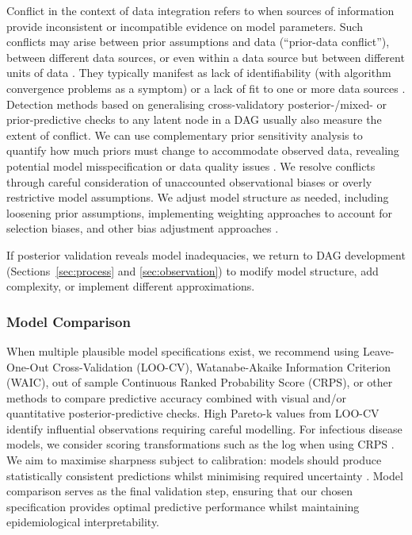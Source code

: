 \documentclass{article}
\begin{document}
Conflict in the context of data integration refers to when sources of information provide inconsistent or incompatible evidence on model parameters. Such conflicts may arise between prior assumptions and data (``prior-data conflict''), between different data sources, or even within a data source but between different units of data \citep{presanis2013conflict,yang2025detecting}.
They typically manifest as lack of identifiability (with algorithm convergence problems as a symptom) or a lack of fit to one or more data sources \citep{presanis2013conflict,deangelis2018analysing}. Detection methods based on generalising cross-validatory posterior-/mixed- or prior-predictive checks to any latent node in a DAG \citep{presanis2013conflict,yang2025detecting} usually also measure the extent of conflict. We can use complementary prior sensitivity analysis to quantify how much priors must change to accommodate observed data, revealing potential model misspecification or data quality issues \citep{Roos2015,Kallioinen2024,yang2025detecting}. We resolve conflicts through careful consideration of unaccounted observational biases or overly restrictive model assumptions. We adjust model structure as needed, including loosening prior assumptions, implementing weighting approaches to account for selection biases, and other bias adjustment approaches \citep{deangelis2018analysing}.

If posterior validation reveals model inadequacies, we return to DAG development (Sections~\ref{sec:process} and \ref{sec:observation}) to modify model structure, add complexity, or implement different approximations.

\subsubsection{Model Comparison}

When multiple plausible model specifications exist, we recommend using Leave-One-Out Cross-Validation (LOO-CV), Watanabe-Akaike Information Criterion (WAIC), out of sample Continuous Ranked Probability Score (CRPS), or other methods to compare predictive accuracy \citep{vehtari2017practical,yao2018using,gneiting2007strictly} combined with visual and/or quantitative posterior-predictive checks.
High Pareto-k values from LOO-CV identify influential observations requiring careful modelling.
For infectious disease models, we consider scoring transformations such as the log when using CRPS \citep{bosse2023scoring}.
We aim to maximise sharpness subject to calibration: models should produce statistically consistent predictions whilst minimising required uncertainty \citep{gneiting2007strictly}.
Model comparison serves as the final validation step, ensuring that our chosen specification provides optimal predictive performance whilst maintaining epidemiological interpretability.
\end{document}
